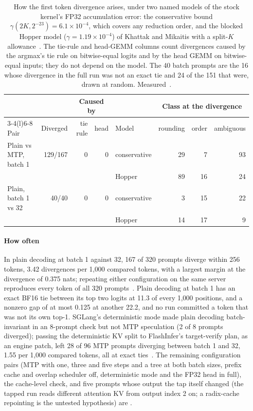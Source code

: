 \begin{table}[tbp]
\small\centering
\begin{tabular}{@{}lrrrlrrr@{}}\toprule
& & \multicolumn{2}{c}{Caused by} & & \multicolumn{3}{c}{Class at the divergence}\\\cmidrule(lr){3-4}\cmidrule(l){6-8}
Pair & Diverged & tie rule & head & Model & rounding & order & ambiguous\\\midrule
Plain vs MTP, batch 1 & 129/167 & 0 & 0 & conservative & 29 & 7 & 93\\
&&&& Hopper & 89 & 16 & 24\\\addlinespace
Plain, batch 1 vs 32 & 40/40 & 0 & 0 & conservative & 3 & 15 & 22\\
&&&& Hopper & 14 & 17 & 9\\\bottomrule
\end{tabular}
\caption{How the first token divergence arises, under two named models of the stock kernel's FP32 accumulation error: the conservative bound $\gamma(2K,2^{-23})=6.1\times10^{-4}$, which covers any reduction order, and the blocked Hopper  model ($\gamma=1.19\times10^{-4}$) of Khattak and Mikaitis with a split-$K$ allowance~\cite{khattak2026}. The tie-rule and head-GEMM columns count divergences caused by the argmax's tie rule on bitwise-equal logits and by the head GEMM on bitwise-equal inputs; they do not depend on the model. The 40 batch prompts are the 16 whose divergence in the full run was not an exact tie and 24 of the 151 that were, drawn at random. Measured~.}
\label{tab:divergence}
\end{table}

\paragraph{How often} In plain decoding at batch 1 against 32, 167 of 320 prompts diverge within 256 tokens, 3.42 divergences per 1,000 compared tokens, with a largest margin at the divergence of 0.375 nats; repeating either configuration on the same server reproduces every token of all 320 prompts~. Plain decoding at batch 1 has an exact BF16 tie between its top two logits at 11.3 of every 1,000 positions, and a nonzero gap of at most 0.125 at another 22.2, and no run committed a token that was not its own top-1. SGLang's deterministic mode made plain decoding batch-invariant in an 8-prompt check but not MTP speculation (2 of 8 prompts diverged); passing the deterministic KV split to FlashInfer's target-verify plan, as an engine patch, left 28 of 96 MTP prompts diverging between batch 1 and 32, 1.55 per 1,000 compared tokens, all at exact ties~. The remaining configuration pairs (MTP with one, three and five steps and a tree at both batch sizes, prefix cache and overlap scheduler off, deterministic mode and the FP32 head in full), the cache-level check, and five prompts whose output the tap itself changed (the tapped run reads different attention KV from output index 2 on; a radix-cache repointing is the untested hypothesis) are .

